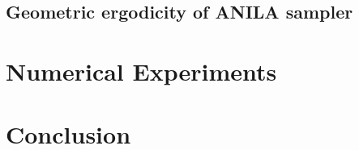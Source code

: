 \documentclass{article}
\begin{document}
\subsection{Geometric ergodicity of ANILA sampler}

\section{Numerical Experiments}


\section{Conclusion}

\newpage






\end{document}
